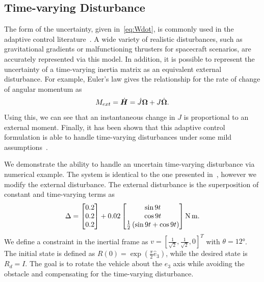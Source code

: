 \subsection{Time-varying Disturbance}\label{ssec:time_varying}
The form of the uncertainty, given in~\cref{eq:Wdot}, is commonly used in the adaptive control literature~\cite{lee2011a,ioannou2012}. 
A wide variety of realistic disturbances, such as gravitational gradients or malfunctioning thrusters for spacecraft scenarios, are accurately represented via this model. 
In addition, it is possible to represent the uncertainty of a time-varying inertia matrix as an equivalent external disturbance. 
For example, Euler's law gives the relationship for the rate of change of angular momentum as
\begin{align*}
    M_{ext} = \dot{\bm{H}} = \dot{J} \bm{\Omega} + J \dot{\bm{\Omega}} .
\end{align*}
Using this, we can see that an instantaneous change in \( J \) is proportional to an external moment.
Finally, it has been shown that this adaptive control formulation is able to handle time-varying disturbances under some mild assumptions~\cite{ioannou2012}. 

We demonstrate the ability to handle an uncertain time-varying disturbance via numerical example.
The system is identical to the one presented in~, however we modify the external disturbance. 
The external disturbance is the superposition of constant and time-varying terms as
\begin{align*}
    \Delta = \begin{bmatrix} 0.2 \\ 0.2 \\0.2 \end{bmatrix} + 0.02 \begin{bmatrix} \sin 9 t \\ \cos 9 t \\ \frac{1}{2} \left( \sin 9t + \cos 9t \right)\end{bmatrix} \si{\newton\meter}.
\end{align*}
We define a constraint in the inertial frame as \( v = [\frac{1}{\sqrt{2}}, \frac{1}{\sqrt{2}}, 0]^T \) with \( \theta = \ang{12} \).
The initial state is defined as \(R(0) = \exp( \frac{\pi}{2} \hat{e}_3) \), while the desired state is \(R_d =I \).
The goal is to rotate the vehicle about the \( e_3 \) axis while avoiding the obstacle and compensating for the time-varying disturbance. 

